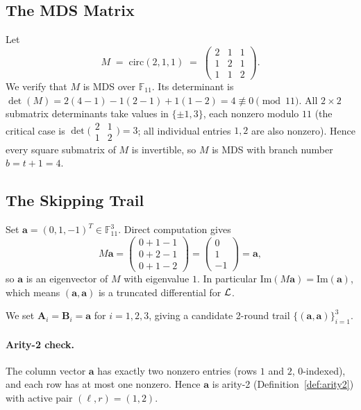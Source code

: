 \documentclass[11pt]{article}
\begin{document}
\subsection{The MDS Matrix}\label{sec:mds-circ3}

Let
\[
    M \;=\; \mathrm{circ}(2,1,1) \;=\;
    \begin{pmatrix}2&1&1\\1&2&1\\1&1&2\end{pmatrix}.
\]
We verify that $M$ is MDS over $\mathbb{F}_{11}$.  Its determinant is
$\det(M)=2(4-1)-1(2-1)+1(1-2)=4\not\equiv 0\pmod{11}$.
All $2\times 2$ submatrix determinants take values in $\{\pm 1,3\}$, each nonzero
modulo $11$ (the critical case is $\det\bigl(\begin{smallmatrix}2&1\\1&2\end{smallmatrix}\bigr)=3$;
all individual entries $1,2$ are also nonzero).
Hence every square submatrix of $M$ is invertible, so $M$ is MDS with
branch number $b=t+1=4$.

\subsection{The Skipping Trail}\label{sec:trail-circ3}

Set $\mathbf{a}=(0,1,-1)^T\in\mathbb{F}_{11}^3$.  Direct computation gives
\[
    M\mathbf{a} = \begin{pmatrix}0+1-1\\0+2-1\\0+1-2\end{pmatrix} = \begin{pmatrix}0\\1\\-1\end{pmatrix} = \mathbf{a},
\]
so $\mathbf{a}$ is an eigenvector of $M$ with eigenvalue $1$.
In particular $\mathrm{Im}(M\mathbf{a})=\mathrm{Im}(\mathbf{a})$, which means
$(\mathbf{a},\mathbf{a})$ is a truncated differential for $\mathcal{L}$.

We set $\mathbf{A}_i=\mathbf{B}_i=\mathbf{a}$ for $i=1,2,3$, giving a
candidate 2-round trail $\{(\mathbf{a},\mathbf{a})\}_{i=1}^{3}$.

\paragraph{Arity-2 check.}
The column vector $\mathbf{a}$ has exactly two nonzero entries (rows $1$ and $2$, $0$-indexed),
and each row has at most one nonzero.  Hence $\mathbf{a}$ is arity-2
(Definition~\ref{def:arity2}) with active pair $(\ell,r)=(1,2)$.
\end{document}
